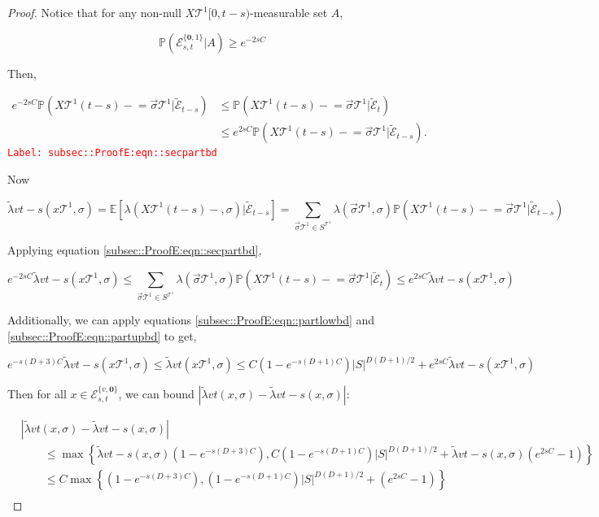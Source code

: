 \documentclass[12pt]{article}
\newcommand{\mb}{\mathbb}
\newcommand{\mc}{\mathcal}
\newcommand{\tr}{\textcolor{red}}
\newcommand{\labe}[1]{\tr{\texttt{Label: #1}}}
\newcommand{\pr}{\mb{P}}							%
\newcommand{\ex}[1]{\mb{E}\left[#1\right]}			%
\renewcommand{\root}{\mathbf{0}}				%
\renewcommand{\v}{v}							%
\renewcommand{\S}{S}							%
\newcommand{\s}{\sigma}							%
\newcommand{\sv}{\vec{\s}}						%
\newcommand{\x}{x}								%
\renewcommand{\t}{t}							%
\renewcommand{\tt}{s}							%
\newcommand{\X}{X}								%
\newcommand{\const}{C}							%
\newcommand{\degr}{D}							%
\newcommand{\tree}{\mc{T}}						%
\newcommand{\sln}[1]{^{#1}}						%
\newcommand{\rate}{\lambda}						%
\newcommand{\alt}[1]{\widetilde{#1}}			%
\newcommand{\evnt}{\mc{E}}						%
\newcommand{\typset}{A}							%
\newcommand{\crate}{\alt{\lambda}}				%
\begin{document}
\begin{proof}
Notice that for any non-null \(\X{\tree\sln{1}}{[0,\t-\tt)}\)-measurable set \(\typset\), 

\[\pr(\evnt^{\{\root,1\}}_{\tt,\t}|\typset) \geq e^{-2\tt\const{}}\]

Then,

\begin{align}
e^{-2\tt\const{}}\pr\left(\X{\tree\sln{1}}{(\t-\tt)-}=\sv{}{\tree\sln{1}}|\alt{\evnt}_{\t-\tt}\right) &\leq \pr\left(\X{\tree\sln{1}}{(\t-\tt)-}=\sv{}{\tree\sln{1}}|\alt{\evnt}_{\t}\right)\nonumber\\
&\leq e^{2\tt\const{}}\pr\left(\X{\tree\sln{1}}{(\t-\tt)-}=\sv{}{\tree\sln{1}}|\alt{\evnt}_{\t-\tt}\right).
\label{subsec::ProofE:eqn::secpartbd}
\end{align}
\labe{subsec::ProofE:eqn::secpartbd}

Now

\[\crate{\v}{\t-\tt}(\x{\tree\sln{1}}{},\s) = \ex{\rate{}(\X{\tree\sln{1}}{(\t-\tt)-},\s)|\alt{\evnt}_{\t-\tt}} = \sum_{\sv{}{\tree\sln{1}}\in \S^{\tree\sln{1}}}\rate{}(\sv{}{\tree\sln{1}},\s)\pr\left(\X{\tree\sln{1}}{(\t-\tt)-} = \sv{}{\tree\sln{1}}|\alt{\evnt}_{\t-\tt}\right)\]

Applying equation \eqref{subsec::ProofE:eqn::secpartbd},

\[e^{-2\tt\const{}}\crate{\v}{\t-\tt}(\x{\tree\sln{1}}{},\s) \leq \sum_{\sv{}{\tree\sln{1}}\in \S^{\tree\sln{1}}} \lambda(\sv{}{\tree\sln{1}},\s)\pr(\X{\tree\sln{1}}{(\t-\tt)-} = \sv{}{\tree\sln{1}}|\alt{\evnt}_\t)\leq e^{2\tt\const{}}\crate{\v}{\t-\tt}(\x{\tree\sln{1}}{},\s)\]

Additionally, we can apply equations \eqref{subsec::ProofE:eqn::partlowbd} and  \eqref{subsec::ProofE:eqn::partupbd} to get,

\[e^{-\tt(\degr+3)\const{}}\crate{\v}{\t-\tt}(\x{\tree\sln{1}}{},\s) \leq \crate{\v}{\t}(\x{\tree\sln{1}}{},\s) \leq \const{}(1 - e^{-\tt(\degr+1)\const{}})|S|^{\degr(\degr+1)/2} + e^{2\tt\const{}}\crate{\v}{\t-\tt}(\x{\tree\sln{1}}{},\s)\]

Then for all \(\x{}{} \in \evnt^{\{\v,\root\}}_{\tt,\t}\), we can bound \(|\crate{\v}{\t}(\x{}{},\s) - \crate{\v}{\t-\tt}(\x{}{},\s)|\):

\begin{align*}
&|\crate{\v}{\t}(\x{}{},\s) - \crate{\v}{\t-\tt}(\x{}{},\s)| \\
&\hspace{24pt}\leq \max\left\{\crate{\v}{\t-\tt}(\x{}{},\s)\left(1 - e^{-\tt(\degr+3)\const{}}\right),\const{}(1-e^{-\tt(\degr+1)\const{}})|\S|^{\degr(\degr+1)/2} + \crate{\v}{\t-\tt}(\x{}{},\s)\left(e^{2\tt\const{}} - 1\right)\right\}\\
&\hspace{24pt}\leq \const{}\max\left\{\left(1 - e^{-\tt(\degr+3)\const{}}\right),(1-e^{-\tt(\degr+1)\const{}})|\S|^{\degr(\degr+1)/2} + \left(e^{2\tt\const{}} - 1\right)\right\}\\
\end{align*}


\end{proof}
\end{document}
